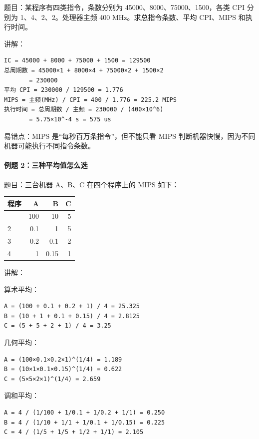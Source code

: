 \documentclass[
]{ctexart}
\newcounter{none} %
\begin{document}
题目：某程序有四类指令，条数分别为 45000、8000、75000、1500，各类 CPI
分别为 1、4、2、2。处理器主频 400 MHz。求总指令条数、平均 CPI、MIPS
和执行时间。

讲解：

\begin{lstlisting}
IC = 45000 + 8000 + 75000 + 1500 = 129500
总周期数 = 45000×1 + 8000×4 + 75000×2 + 1500×2
       = 230000
平均 CPI = 230000 / 129500 = 1.776
MIPS = 主频(MHz) / CPI = 400 / 1.776 = 225.2 MIPS
执行时间 = 总周期数 / 主频 = 230000 / (400×10^6)
       = 5.75×10^-4 s = 575 us
\end{lstlisting}

易错点：MIPS 是``每秒百万条指令''，但不能只看 MIPS
判断机器快慢，因为不同机器可能执行不同指令条数。

\paragraph{例题
2：三种平均值怎么选}\label{ux4f8bux9898-2ux4e09ux79cdux5e73ux5747ux503cux600eux4e48ux9009}

题目：三台机器 A、B、C 在四个程序上的 MIPS 如下：

{\def\LTcaptype{none} %
\begin{longtable}[]{@{}lrrr@{}}
\toprule\noalign{}
程序 & A & B & C \\
\midrule\noalign{}
\endhead
\bottomrule\noalign{}
\endlastfoot
1 & 100 & 10 & 5 \\
2 & 0.1 & 1 & 5 \\
3 & 0.2 & 0.1 & 2 \\
4 & 1 & 0.15 & 1 \\
\end{longtable}
}

讲解：

算术平均：

\begin{lstlisting}
A = (100 + 0.1 + 0.2 + 1) / 4 = 25.325
B = (10 + 1 + 0.1 + 0.15) / 4 = 2.8125
C = (5 + 5 + 2 + 1) / 4 = 3.25
\end{lstlisting}

几何平均：

\begin{lstlisting}
A = (100×0.1×0.2×1)^(1/4) = 1.189
B = (10×1×0.1×0.15)^(1/4) = 0.622
C = (5×5×2×1)^(1/4) = 2.659
\end{lstlisting}

调和平均：

\begin{lstlisting}
A = 4 / (1/100 + 1/0.1 + 1/0.2 + 1/1) = 0.250
B = 4 / (1/10 + 1/1 + 1/0.1 + 1/0.15) = 0.225
C = 4 / (1/5 + 1/5 + 1/2 + 1/1) = 2.105
\end{lstlisting}
\end{document}
